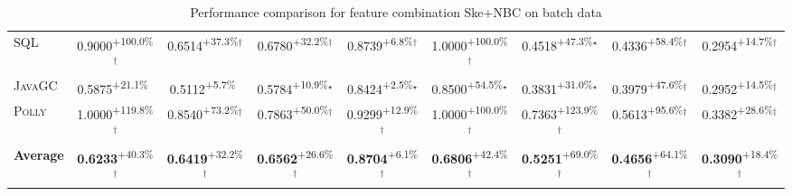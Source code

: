 \begin{table}[htbp]
\begin{tabular}{l|cccc|cccc}
\textsc{SQL} & \cellcolor{green!30}0.9000\textsuperscript{+100.0\%}$^\dagger$ & \cellcolor{green!30}0.6514\textsuperscript{+37.3\%}$^\dagger$ & \cellcolor{green!30}0.6780\textsuperscript{+32.2\%}$^\dagger$ & \cellcolor{green!30}0.8739\textsuperscript{+6.8\%}$^\dagger$ & \cellcolor{green!30}1.0000\textsuperscript{+100.0\%}$^\dagger$ & \cellcolor{green!30}0.4518\textsuperscript{+47.3\%}$^\star$ & \cellcolor{green!30}0.4336\textsuperscript{+58.4\%}$^\dagger$ & \cellcolor{green!30}0.2954\textsuperscript{+14.7\%}$^\dagger$ \\
\textsc{JavaGC} & \cellcolor{green!30}0.5875\textsuperscript{+21.1\%}$^{\,\,\,}$ & \cellcolor{green!30}0.5112\textsuperscript{+5.7\%}$^{\,\,\,}$ & \cellcolor{green!30}0.5784\textsuperscript{+10.9\%}$^\star$ & \cellcolor{green!30}0.8424\textsuperscript{+2.5\%}$^\star$ & \cellcolor{green!30}0.8500\textsuperscript{+54.5\%}$^\star$ & \cellcolor{green!30}0.3831\textsuperscript{+31.0\%}$^\star$ & \cellcolor{green!30}0.3979\textsuperscript{+47.6\%}$^\dagger$ & \cellcolor{green!30}0.2952\textsuperscript{+14.5\%}$^\dagger$ \\
\textsc{Polly} & \cellcolor{green!30}1.0000\textsuperscript{+119.8\%}$^\dagger$ & \cellcolor{green!30}0.8540\textsuperscript{+73.2\%}$^\dagger$ & \cellcolor{green!30}0.7863\textsuperscript{+50.0\%}$^\dagger$ & \cellcolor{green!30}0.9299\textsuperscript{+12.9\%}$^\dagger$ & \cellcolor{green!30}1.0000\textsuperscript{+100.0\%}$^\dagger$ & \cellcolor{green!30}0.7363\textsuperscript{+123.9\%}$^\dagger$ & \cellcolor{green!30}0.5613\textsuperscript{+95.6\%}$^\dagger$ & \cellcolor{green!30}0.3382\textsuperscript{+28.6\%}$^\dagger$ \\
\hline
\textbf{Average} & \cellcolor{green!30}\textbf{0.6233}\textsuperscript{+40.3\%}$^\dagger$ & \cellcolor{green!30}\textbf{0.6419}\textsuperscript{+32.2\%}$^\dagger$ & \cellcolor{green!30}\textbf{0.6562}\textsuperscript{+26.6\%}$^\dagger$ & \cellcolor{green!30}\textbf{0.8704}\textsuperscript{+6.1\%}$^\dagger$ & \cellcolor{green!30}\textbf{0.6806}\textsuperscript{+42.4\%}$^\dagger$ & \cellcolor{green!30}\textbf{0.5251}\textsuperscript{+69.0\%}$^\dagger$ & \cellcolor{green!30}\textbf{0.4656}\textsuperscript{+64.1\%}$^\dagger$ & \cellcolor{green!30}\textbf{0.3090}\textsuperscript{+18.4\%}$^\dagger$ \\
\hline
\end{tabular}
\caption{Performance comparison for feature combination Ske+NBC on batch data}
\label{tab:combo_Ske_NBC_performance_batch}
\end{table}